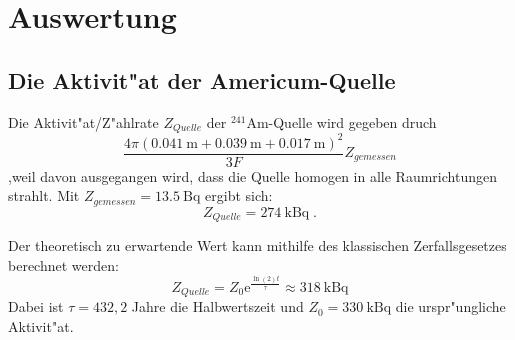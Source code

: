 \section{Auswertung}
\label{sec:Auswertung}

\subsection{Die Aktivit"at der Americum-Quelle}
  Die Aktivit"at/Z"ahlrate $Z_{Quelle}$ der $^{241}\text{Am}$-Quelle wird gegeben druch
  \begin{equation}
    \frac{4\pi(\SI{0,041}{\meter}+\SI{0,039}{\meter}+\SI{0.017}{\meter})^2}{3F}Z_{gemessen}
  \end{equation}
  ,weil davon ausgegangen wird, dass die Quelle homogen in alle Raumrichtungen strahlt.
  Mit $Z_{gemessen}=\SI{13,5}{\becquerel}$ ergibt sich:
  \begin{equation}
    Z_{Quelle} = \SI{274}{\kilo \becquerel} \; .
  \end{equation}

  Der theoretisch zu erwartende Wert kann mithilfe des klassischen Zerfallsgesetzes berechnet werden:
  \begin{equation}
    Z_{Quelle} = Z_0\text{e}^{\frac{\ln(2)t}{\tau}} \approx \SI{318}{\kilo \becquerel}
  \end{equation}
  Dabei ist $\tau=432,2$ Jahre die Halbwertszeit und $Z_0=\SI{330}{\kilo \becquerel}$ \cite{Anleitung} die urspr"ungliche Aktivit"at.


